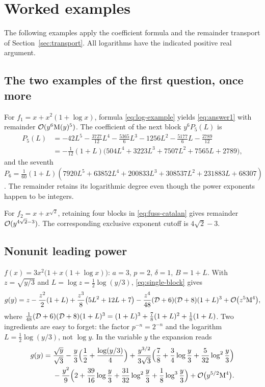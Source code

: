 \section{Worked examples}
\label{sec:examples}

The following examples apply the coefficient formula and the remainder transport of Section~\ref{sec:transport}. All logarithms have the indicated positive real argument.

\subsection{The two examples of the first question, once more}

For $f_1=x+x^2(1+\log x)$, formula \eqref{eq:log-example} yields \eqref{eq:answer1} with remainder $\mathcal O(y^6\mathrm M(y)^5)$. The coefficient of the next block $y^6P_5(L)$ is
\begin{align*}
 P_5(L)&=-42L^5-\tfrac{3727}{12}L^4-\tfrac{5365}{6}L^3-1256L^2-\tfrac{5177}{6}L-\tfrac{2789}{12}\\
 &=-\tfrac1{12}(1+L)\bigl(504L^4+3223L^3+7507L^2+7565L+2789\bigr),
\end{align*}
and the seventh $P_6=\tfrac1{60}(1+L)(7920L^5+63852L^4+200833L^3+308537L^2+231883L+68307)$. The remainder retains its logarithmic degree even though the power exponents happen to be integers.

For $f_2=x+x^{\sqrt2}$, retaining four blocks in \eqref{eq:fuss-catalan} gives remainder $\mathcal O(y^{4\sqrt2-3})$. The corresponding exclusive exponent cutoff is $4\sqrt2-3$.

\subsection{Nonunit leading power}

$f(x)=3x^2\bigl(1+x(1+\log x)\bigr)$: $a=3$, $p=2$, $\delta=1$, $B=1+L$. With $z=\sqrt{y/3}$ and $L=\log z=\tfrac12\log(y/3)$, \eqref{eq:single-block} gives
\begin{equation}
 g(y)=z-\frac{z^2}{2}(1+L)+\frac{z^3}{8}\bigl(5L^2+12L+7\bigr)-\frac{z^4}{48}(\mathcal D+6)(\mathcal D+8)(1+L)^3+\mathcal O\bigl(z^5\mathrm M^4\bigr),
 \label{eq:nonunit}
\end{equation}
where $\tfrac1{48}(\mathcal D+6)(\mathcal D+8)(1+L)^3=(1+L)^3+\tfrac78(1+L)^2+\tfrac18(1+L)$. Two ingredients are easy to forget: the factor $p^{-n}=2^{-n}$ and the logarithm $L=\tfrac12\log(y/3)$, not $\log y$. In the variable $y$ the expansion reads
\begin{align*}
 g(y)={}&\frac{\sqrt y}{\sqrt3}-\frac y3\Bigl(\frac12+\frac{\log(y/3)}{4}\Bigr)+\frac{y^{3/2}}{3\sqrt3}\Bigl(\frac78+\frac34\log\frac y3+\frac5{32}\log^2\frac y3\Bigr)\\
 &-\frac{y^2}{9}\Bigl(2+\frac{39}{16}\log\frac y3+\frac{31}{32}\log^2\frac y3+\frac18\log^3\frac y3\Bigr)+\mathcal O\bigl(y^{5/2}\mathrm M^4\bigr).
\end{align*}

